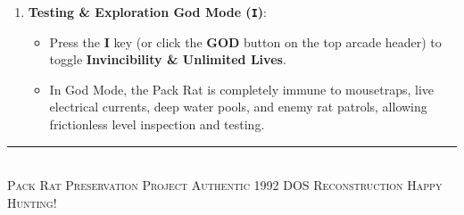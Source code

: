 \documentclass[10pt,letterpaper]{article}
\begin{document}
\begin{enumerate}[leftmargin=1.5em,itemsep=2pt]
    \item \textbf{Testing \& Exploration God Mode (\texttt{I})}:
    \begin{itemize}[noitemsep]
        \item Press the \textbf{I} key (or click the \textbf{GOD} button on the top arcade header) to toggle \textbf{Invincibility \& Unlimited Lives}.
        \item In God Mode, the Pack Rat is completely immune to mousetraps, live electrical currents, deep water pools, and enemy rat patrols, allowing frictionless level inspection and testing.
    \end{itemize}
\end{enumerate}

\vspace{0.3em}
\begin{center}
    \rule{0.6\linewidth}{0.8pt}\\[3pt]
    \textsc{\small Pack Rat Preservation Project \quad\textbullet\quad Authentic 1992 DOS Reconstruction \quad\textbullet\quad Happy Hunting!}
\end{center}
\end{document}
